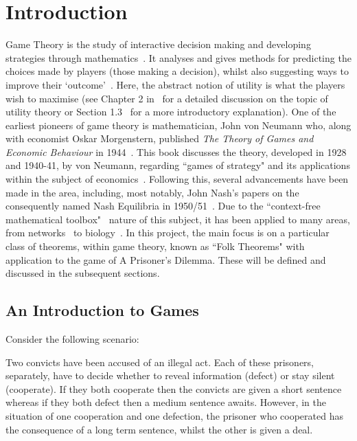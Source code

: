 \chapter{Introduction}\label{ch:Introduction}

Game Theory is the study of interactive decision making and developing
strategies through mathematics~\cite{Dictionary2013}. It analyses and gives
methods for predicting the choices made by players (those making a decision),
whilst also suggesting ways to improve their `outcome'~\cite{maschler_solan_zamir_2013}. Here, the abstract notion of utility is what
the players wish to maximise (see Chapter 2 in~\cite{maschler_solan_zamir_2013}
for a detailed discussion on the topic of utility theory or Section 1.3~\cite{Webb2007} for a more introductory explanation). One of the earliest
pioneers of game theory is mathematician, John von Neumann who, along with
economist Oskar Morgenstern, published \textit{The Theory of Games and Economic
Behaviour} in 1944~\cite{maschler_solan_zamir_2013}. This book discusses the
theory, developed in 1928 and 1940-41, by von Neumann, regarding ``games of
strategy" and its applications within the subject of economics~\cite{von2007theory}. Following this, several advancements have been made in the
area, including, most notably, John Nash's papers on the consequently named Nash
Equilibria in 1950/51~\cite{nash1950equilibrium, nash1951non}. Due to the
``context-free mathematical toolbox"~\cite{maschler_solan_zamir_2013} nature of
this subject, it has been applied to many areas, from
networks~\cite{liang2012game, 1593279} to biology~\cite{chen2009robust, adeoye2012application}. In this project, the main focus is on a
particular class of theorems, within game theory, known as ``Folk Theorems" with
application to the game of A Prisoner's Dilemma. These will be defined and
discussed in the subsequent sections.

\section{An Introduction to Games}\label{sec:An_Intro_to_Games}
Consider the following scenario:

\begin{center}
    Two convicts have been accused of an illegal act. Each of these prisoners,
    separately, have to decide whether to reveal information (defect) or stay
    silent (cooperate). If they both cooperate then the convicts are given a
    short sentence whereas if they both defect then a medium sentence awaits.
    However, in the situation of one cooperation and one defection, the prisoner
    who cooperated has the consequence of a long term sentence, whilst the other
    is given a deal.~\cite{Knight2017}
\end{center}

